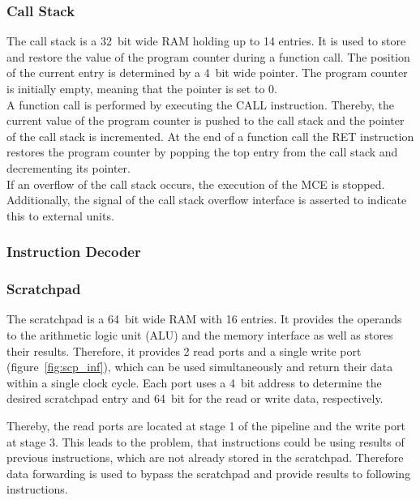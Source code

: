 \subsubsection{Call Stack}

The call stack is a 32~bit wide RAM holding up to 14 entries.
It is used to store and restore the value of the program counter during a function call.
The position of the current entry is determined by a 4~bit wide pointer.
The program counter is initially empty, meaning that the pointer is set to 0.\\
A function call is performed by executing the CALL instruction.
Thereby, the current value of the program counter is pushed to the call stack and the pointer of the call stack is incremented.
At the end of a function call the RET instruction restores the program counter by popping the top entry from the call stack and decrementing its pointer.\\
If an overflow of the call stack occurs, the execution of the MCE is stopped.
Additionally, the signal of the call stack overflow interface is asserted to indicate this to external units.

\subsubsection{Instruction Decoder}



\subsubsection{Scratchpad}

The scratchpad is a 64~bit wide RAM with 16 entries.
It provides the operands to the arithmetic logic unit (ALU) and the memory interface as well as stores their results.
Therefore, it provides 2 read ports and a single write port (figure~\ref{fig:scp_inf}), which can be used simultaneously and return their data within a single clock cycle.
Each port uses a 4~bit address to determine the desired scratchpad entry and 64~bit for the read or write data, respectively.


Thereby, the read ports are located at stage 1 of the pipeline and the write port at stage 3.
This leads to the problem, that instructions could be using results of previous instructions, which are not already stored in the scratchpad.
Therefore data forwarding is used to bypass the scratchpad and provide results to following instructions.

